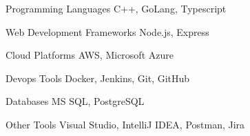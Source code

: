 

\begin{cvskills}

    \cvskill
      {Programming Languages} %
      {C++, GoLang, Typescript} %
  

    \cvskill
      {Web Development Frameworks} %
      {Node.js, Express} %
  

    \cvskill
      {Cloud Platforms} %
      {AWS, Microsoft Azure} %
  

    \cvskill
      {Devops Tools} %
      {Docker, Jenkins, Git, GitHub} %
  

    \cvskill
      {Databases} %
      {MS SQL, PostgreSQL} %
  

    \cvskill
      {Other Tools} %
      {Visual Studio, IntelliJ IDEA, Postman, Jira} %
  
\end{cvskills}
